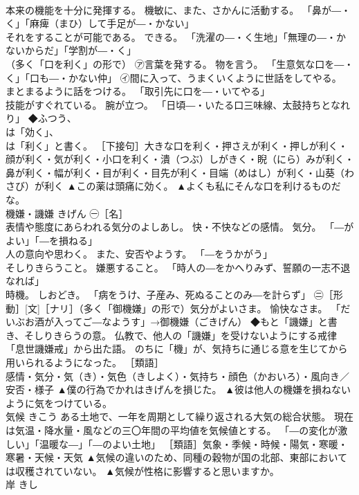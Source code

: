 \documentclass[8pt]{extreport}
\begin{document}
\begin{CJK}{UTF8}{min}
\\	本来の機能を十分に発揮する。 機敏に、また、さかんに活動する。 「鼻が―・く」「麻痺（まひ）して手足が―・かない」 
\\	それをすることが可能である。 できる。 「洗濯の―・く生地」「無理の―・かないからだ」「学割が―・く」 
\\	（多く「口を利く」の形で） ㋐言葉を発する。 物を言う。 「生意気な口を―・く」「口も―・かない仲」 ㋑間に入って、うまくいくように世話をしてやる。 まとまるように話をつける。 「取引先に口を―・いてやる」 
\\	技能がすぐれている。 腕が立つ。 「日頃―・いたる口三味線、太鼓持ちとなれり」 ◆ふつう、 
\\	は「効く」、 
\\	は「利く」と書く。 ［下接句］大きな口を利く・押さえが利く・押しが利く・顔が利く・気が利く・小口を利く・潰（つぶ）しがきく・睨（にら）みが利く・鼻が利く・幅が利く・目が利く・目先が利く・目端（めはし）が利く・山葵（わさび）が利く	▲この薬は頭痛に効く。 ▲よくも私にそんな口を利けるものだな。
\\	機嫌・譏嫌	きげん	㊀［名］ 
\\	表情や態度にあらわれる気分のよしあし。 快・不快などの感情。 気分。 「―がよい」「―を損ねる」 
\\	人の意向や思わく。 また、安否やようす。 「―をうかがう」 
\\	そしりきらうこと。 嫌悪すること。 「時人の―をかへりみず、誓願の一志不退なれば」 
\\	時機。 しおどき。 「病をうけ、子産み、死ぬることのみ―を計らず」 ㊁［形動］[文]［ナリ］（多く「御機嫌」の形で）気分がよいさま。 愉快なさま。 「だいぶお酒が入ってご―なようす」→御機嫌（ごきげん） ◆もと「譏嫌」と書き、そしりきらうの意。 仏教で、他人の「譏嫌」を受けないようにする戒律「息世譏嫌戒」から出た語。 のちに「機」が、気持ちに通じる意を生じてから用いられるようになった。 ［類語］ 
\\	感情・気分・気（き）・気色（きしよく）・気持ち・顔色（かおいろ）・風向き／
\\	安否・様子	▲僕の行為でかれはきげんを損じた。 ▲彼は他人の機嫌を損ねないように気をつけている。
\\	気候	きこう	ある土地で、一年を周期として繰り返される大気の総合状態。 現在は気温・降水量・風などの三〇年間の平均値を気候値とする。 「―の変化が激しい」「温暖な―」「―のよい土地」 ［類語］気象・季候・時候・陽気・寒暖・寒暑・天候・天気	▲気候の違いのため、同種の穀物が国の北部、東部においては収穫されていない。 ▲気候が性格に影響すると思いますか。
\\	岸	きし	

\end{CJK}
\end{document}
